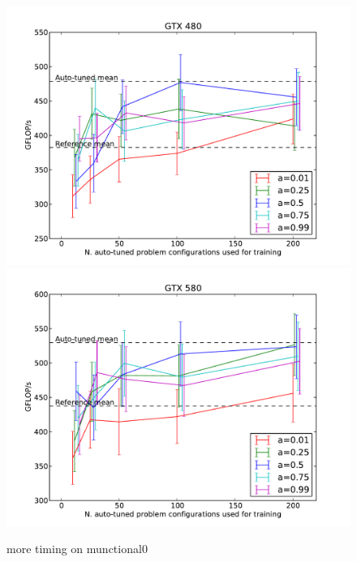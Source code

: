 \documentclass{sig-alternate}
\begin{document}
\begin{figure}
\centering
\includegraphics[scale=.42]{fig_ntrain_munctional0_480.pdf}
\includegraphics[scale=.42]{fig_ntrain_munctional0_580.pdf}
\caption{more timing on munctional0}
\label{fig:fig_ntrain}
\end{figure}
\end{document}
